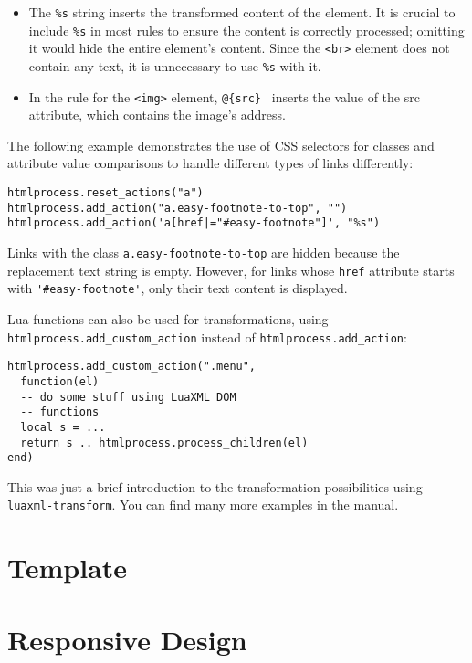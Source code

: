 \documentclass{ltugboat}
\newcommand\program[1]{\tbcode{#1}}
\begin{document}
\begin{itemize}
  \item The \verb|%s| string inserts the transformed content of the element.
    It is crucial to include \verb|%s| in most rules to ensure the content is
    correctly processed; omitting it would hide the entire element's content.
    Since the \verb|<br>| element does not contain any text, it is unnecessary
    to use \verb|%s| with it.
  \item In the rule for the \verb|<img>| element, \verb|@{src} | inserts the
    value of the src attribute, which contains the image's address.
\end{itemize}

The following example demonstrates the use of CSS selectors for classes and
attribute value comparisons to handle different types of links differently:

\begin{verbatim}
htmlprocess.reset_actions("a")
htmlprocess.add_action("a.easy-footnote-to-top", "")
htmlprocess.add_action('a[href|="#easy-footnote"]', "%s")
\end{verbatim}

Links with the class \verb|a.easy-footnote-to-top| are hidden because the
replacement text string is empty. However, for links whose \verb|href|
attribute starts with \verb|'#easy-footnote'|, only their text content is
displayed.

Lua functions can also be used for transformations, using 
\verb|htmlprocess.add_custom_action| instead of \verb|htmlprocess.add_action|:

\begin{verbatim}
htmlprocess.add_custom_action(".menu", 
  function(el)
  -- do some stuff using LuaXML DOM 
  -- functions
  local s = ...
  return s .. htmlprocess.process_children(el)
end)
\end{verbatim}

This was just a brief introduction to the transformation possibilities using
\texttt{luaxml-transform}. You can find many more examples in the
\program{LuaXML} manual.





\section{Template}
\section{Responsive Design}
\end{document}
